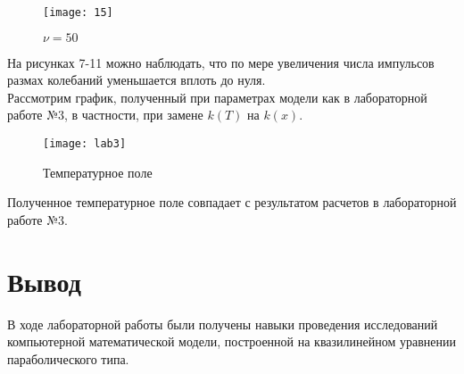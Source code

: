 \documentclass[a4paper, 14pt]{article}
\begin{document}
\begin{enumerate}
\begin{figure}[H]
        	\begin{center}
        		\texttt{[image: 15]}
        		\caption{$\nu=50$}
        		\label{a2b2}
        	\end{center}
\end{figure}

На рисунках 7-11 можно наблюдать, что по мере увеличения числа импульсов размах колебаний уменьшается вплоть до нуля.\\

Рассмотрим график, полученный при параметрах модели как в лабораторной работе №3, в частности, при замене $k(T)$ на $k(x)$.

\begin{figure}[H]
        	\begin{center}
        		\texttt{[image: lab3]}
        		\caption{Температурное поле}
        		\label{a2b2}
        	\end{center}
\end{figure}

Полученное температурное поле совпадает с результатом расчетов в лабораторной работе №3.

\end{enumerate}

\section*{Вывод}

В ходе лабораторной работы были получены навыки проведения исследований компьютерной математической модели, построенной на  квазилинейном уравнении параболического типа.
\end{document}
